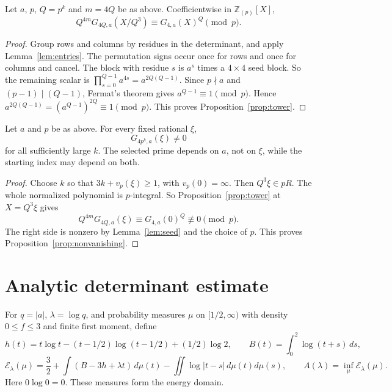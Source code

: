 \begin{proposition}\label{prop:tower}
Let \(a\), \(p\), \(Q=p^k\) and \(m=4Q\) be as above. Coefficientwise in \(\mathbb{Z}_{(p)}[X]\),
\[
 Q^{4m}G_{4Q,a}(X/Q^3)\equiv G_{4,a}(X)^Q\pmod p.
\]
\end{proposition}

\begin{proof}
Group rows and columns by residues in the determinant, and apply Lemma~\ref{lem:entries}. The permutation signs occur once for rows and once for columns and cancel. The block with residue \(s\) is \(a^s\) times a \(4\times4\) seed block. So the remaining scalar is \(\prod_{s=0}^{Q-1}a^{4s}=a^{2Q(Q-1)}\). Since \(p\nmid a\) and \((p-1)\mid(Q-1)\), Fermat's theorem gives \(a^{Q-1}\equiv1\pmod p\). Hence \(a^{2Q(Q-1)}=(a^{Q-1})^{2Q}\equiv1\pmod p\). This proves Proposition~\ref{prop:tower}.
\end{proof}

\begin{proposition}\label{prop:nonvanishing}
Let \(a\) and \(p\) be as above. For every fixed rational \(\xi\),
\[
 G_{4p^k,a}(\xi)\ne0
\]
for all sufficiently large \(k\). The selected prime depends on \(a\), not on \(\xi\), while the starting index may depend on both.
\end{proposition}

\begin{proof}
Choose \(k\) so that \(3k+v_p(\xi)\ge1\), with \(v_p(0)=\infty\). Then \(Q^3\xi\in pR\). The whole normalized polynomial is \(p\)-integral. So Proposition~\ref{prop:tower} at \(X=Q^3\xi\) gives
\[
 Q^{4m}G_{4Q,a}(\xi)
 \equiv G_{4,a}(0)^Q\not\equiv0\pmod p.
\]
The right side is nonzero by Lemma~\ref{lem:seed} and the choice of \(p\). This proves Proposition~\ref{prop:nonvanishing}.
\end{proof}

\section{Analytic determinant estimate}\label{sec:analytic}

For \(q=|a|\), \(\lambda=\log q\), and probability measures \(\mu\) on \([1/2,\infty)\) with density \(0\le f\le3\) and finite first moment, define
\[
 h(t)=t\log t-(t-1/2)\log(t-1/2)+(1/2)\log2,\qquad
 B(t)=\int_0^2\log(t+s)\,ds,
\]
\[
 \mathcal E_\lambda(\mu)=\frac32+\int(B-3h+\lambda t)\,d\mu(t)
 -\iint\log|t-s|\,d\mu(t)d\mu(s),
 \qquad A(\lambda)=\inf_\mu \mathcal E_\lambda(\mu).
\]
Here \(0\log0=0\). These measures form the energy domain.

